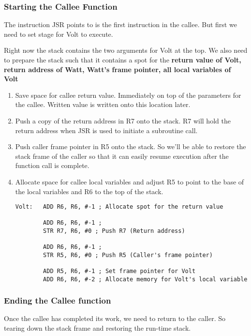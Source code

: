 \subsubsection{Starting the Callee Function}
The instruction JSR points to is the first instruction in the callee. But first we need to set stage for Volt to execute.

Right now the stack contains the two arguments for Volt at the top. We also need to prepare the stack such that it contains a spot for the \textbf{return value of Volt, return address of Watt, Watt's frame pointer, all local variables of Volt}


\begin{enumerate}
    \item Save space for callee return value. Immediately on top of the parameters for the callee. Written value is written onto this location later.
    \item Push a copy of the return address in R7 onto the stack. R7 will hold the return address when JSR is used to initiate a subroutine call.
    \item Push caller frame pointer in R5 onto the stack. So we'll be able to restore the stack frame of the caller so that it can easily resume execution after the function call  is complete.
    \item Allocate space for callee local variables and adjust R5 to point to the base of the local variables and R6 to the top of the stack.

\begin{verbatim}
Volt:   ADD R6, R6, #-1 ; Allocate spot for the return value
    
        ADD R6, R6, #-1 ;
        STR R7, R6, #0 ; Push R7 (Return address)
        
        ADD R6, R6, #-1 ;
        STR R5, R6, #0 ; Push R5 (Caller's frame pointer)
        
        ADD R5, R6, #-1 ; Set frame pointer for Volt
        ADD R6, R6, #-2 ; Allocate memory for Volt's local variable
\end{verbatim}
\end{enumerate}


\subsubsection{Ending the Callee function}
Once the callee has completed its work, we need to return to the caller. So tearing down the stack frame and restoring the run-time stack.

